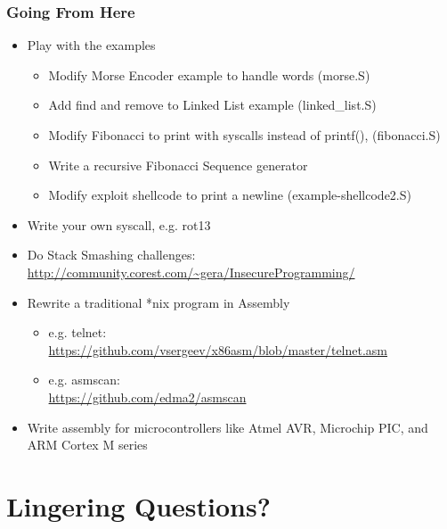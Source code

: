 \documentclass[11pt,xcolor=dvipsnames]{beamer}
\begin{document}
\begin{frame}[fragile,t]
\frametitle{Going From Here}
\vspace{-0.5em}
\begin{itemize}
  \item Play with the examples
  \begin{itemize}
    \item Modify Morse Encoder example to handle words ({\ttfamily morse.S})
    \item Add find and remove to Linked List example ({\ttfamily linked\_list.S})
    \item Modify Fibonacci to print with syscalls instead of {\ttfamily printf()}, ({\ttfamily fibonacci.S})
    \item Write a recursive Fibonacci Sequence generator
    \item Modify exploit shellcode to print a newline ({\ttfamily example-shellcode2.S})
  \end{itemize}
  \item Write your own syscall, e.g. rot13
  \item Do Stack Smashing challenges: \\ {\footnotesize \url{http://community.corest.com/~gera/InsecureProgramming/}}
  \item Rewrite a traditional *nix program in Assembly
\begin{itemize}
  \item e.g. telnet: \\ {\footnotesize \url{https://github.com/vsergeev/x86asm/blob/master/telnet.asm}}
  \item e.g. asmscan: \\ {\footnotesize\url{https://github.com/edma2/asmscan}}
\end{itemize}
  \item Write assembly for microcontrollers like Atmel AVR, Microchip PIC, and ARM Cortex M series
\end{itemize}
\end{frame}

\section*{Lingering Questions?}
\end{document}
